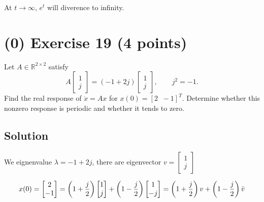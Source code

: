 \documentclass[12pt,a4paper]{article}
\begin{document}
At $t\to\infty$, $e^t$ will diverence to infinity.


\vspace{3cm}
\clearpage
\section*{(0) Exercise 19 \hfill {\normalsize (4 points)}}
Let $A\in\mathbb R^{2\times2}$ satisfy
\[
A\begin{bmatrix}1\\j\end{bmatrix}
=(-1+2j)\begin{bmatrix}1\\j\end{bmatrix},\qquad j^2=-1.
\]
Find the real response of $\dot x=Ax$ for $x(0)=[2\;\;-1]^T$. Determine whether this nonzero response is periodic and whether it tends to zero.
\subsection*{Solution}

We eignenvalue $\lambda = -1 + 2j$, there are eigenvector $v = \begin{bmatrix}
	1 \\ j
\end{bmatrix}$

\[
x(0) =\begin{bmatrix}
	2 \\ -1
\end{bmatrix}= \left( 1 + {j\over2} \right)\begin{bmatrix}
1 \\j
\end{bmatrix} + \left(1 - {j\over2}\right)\begin{bmatrix}
1 \\ -j
\end{bmatrix} = \left(1 + {j\over2}\right)v + \left(1 - {j\over2}\right)\bar v
\]
\end{document}
